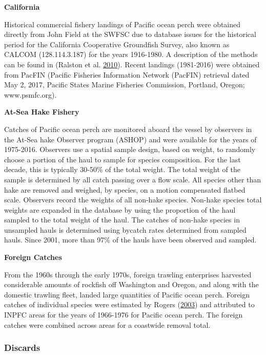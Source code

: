 \documentclass[12pt,]{article}
\begin{document}
\textbf{California}

Historical commercial fishery landings of Pacific ocean perch were
obtained directly from John Field at the SWFSC due to database issues
for the historical period for the California Cooperative Groundfish
Survey, also known as CALCOM (128.114.3.187) for the years 1916-1980. A
description of the methods can be found in (Ralston et al.
\protect\hyperlink{ref-ralston_documentation_2010}{2010}). Recent
landings (1981-2016) were obtained from PacFIN (Pacific Fisheries
Information Network (PacFIN) retrieval dated May 2, 2017, Pacific States
Marine Fisheries Commission, Portland, Oregon; www.psmfc.org).

\textbf{At-Sea Hake Fishery}

Catches of Pacific ocean perch are monitored aboard the vessel by
observers in the At-Sea hake Observer program (ASHOP) and were available
for the years of 1975-2016. Observers use a spatial sample design, based
on weight, to randomly choose a portion of the haul to sample for
species composition. For the last decade, this is typically 30-50\% of
the total weight. The total weight of the sample is determined by all
catch passing over a flow scale. All species other than hake are removed
and weighed, by species, on a motion compensated flatbed scale.
Observers record the weights of all non-hake species. Non-hake species
total weights are expanded in the database by using the proportion of
the haul sampled to the total weight of the haul. The catches of
non-hake species in unsampled hauls is determined using bycatch rates
determined from sampled hauls. Since 2001, more than 97\% of the hauls
have been observed and sampled.

\textbf{Foreign Catches}

From the 1960s through the early 1970s, foreign trawling enterprises
harvested considerable amounts of rockfish off Washington and Oregon,
and along with the domestic trawling fleet, landed large quantities of
Pacific ocean perch. Foreign catches of individual species were
estimated by Rogers (\protect\hyperlink{ref-rogers_species_2003}{2003})
and attributed to INPFC areas for the years of 1966-1976 for Pacific
ocean perch. The foreign catches were combined across areas for a
coastwide removal total.

\subsubsection{Discards}\label{discards}
\end{document}
